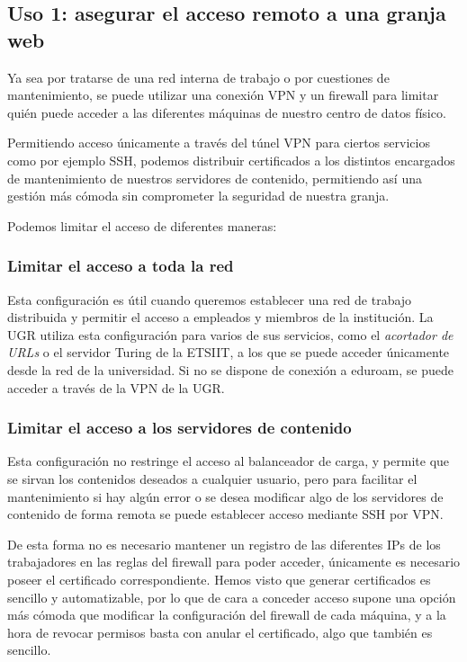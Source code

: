 \documentclass[11pt,a4paper]{article}
\begin{document}
\subsection{Uso 1: asegurar el acceso remoto a una granja web}

Ya sea por tratarse de una red interna de trabajo o por cuestiones de mantenimiento, se puede utilizar una conexión VPN y un firewall para limitar quién puede acceder a las diferentes máquinas de nuestro centro de datos físico.

\medskip

Permitiendo acceso únicamente a través del túnel VPN para ciertos servicios como por ejemplo SSH, podemos distribuir certificados a los distintos encargados de mantenimiento de nuestros servidores de contenido, permitiendo así una gestión más cómoda sin comprometer la seguridad de nuestra granja.

\medskip

Podemos limitar el acceso de diferentes maneras:

\subsubsection*{Limitar el acceso a toda la red}

Esta configuración es útil cuando queremos establecer una red de trabajo distribuida y permitir el acceso a empleados y miembros de la institución. La UGR utiliza esta configuración para varios de sus servicios, como el \textit{acortador de URLs} o el servidor Turing de la ETSIIT, a los que se puede acceder únicamente desde la red de la universidad. Si no se dispone de conexión a eduroam, se puede acceder a través de la VPN de la UGR.

\subsubsection*{Limitar el acceso a los servidores de contenido}

Esta configuración no restringe el acceso al balanceador de carga, y permite que se sirvan los contenidos deseados a cualquier usuario, pero para facilitar el mantenimiento si hay algún error o se desea modificar algo de los servidores de contenido de forma remota se puede establecer acceso mediante SSH por VPN. 

\medskip

De esta forma no es necesario mantener un registro de las diferentes IPs de los trabajadores en las reglas del firewall para poder acceder, únicamente es necesario poseer el certificado correspondiente. Hemos visto que generar certificados es sencillo y automatizable, por lo que de cara a conceder acceso supone una opción más cómoda que modificar la configuración del firewall de cada máquina, y a la hora de revocar permisos basta con anular el certificado, algo que también es sencillo.
\end{document}
